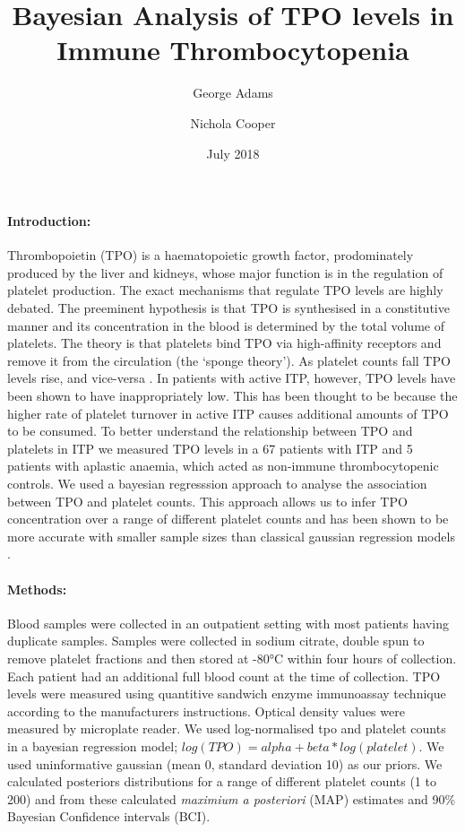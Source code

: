 \documentclass[11pt]{article}
\title{Bayesian Analysis of TPO levels in Immune Thrombocytopenia}
\author[1,2]{\small George Adams}
\author[1,2]{\small Nichola Cooper}
\affil[1]{\footnotesize Imperial College London, Kensington, London SW7 2AZ}
\affil[2]{\footnotesize Hammersmith Hospital, Imperial College NHS Trust, London W12 0HS}
\date{July 2018}
\begin{document}
\maketitle

\paragraph{Introduction:} Thrombopoietin (TPO) is a haematopoietic growth factor, prodominately produced by the liver and kidneys, whose major function is in the regulation of platelet production. The exact mechanisms that regulate TPO levels are highly debated. The preeminent hypothesis is that TPO is synthesised in a constitutive manner and its concentration in the blood is determined by the total volume of platelets. The theory is that platelets bind TPO via high-affinity receptors and remove it from the circulation (the `sponge theory'). As platelet counts fall TPO levels rise, and vice-versa \cite{EtoLinkagemechanismsthrombocytopenia2016}. %
In patients with active ITP, however, TPO levels have been shown to have inappropriately low. This has been thought to be because the higher rate of platelet turnover in active ITP causes additional amounts of TPO to be consumed. To better understand the relationship between TPO and platelets in ITP we measured TPO levels in a 67 patients with ITP and 5 patients with aplastic anaemia, which acted as non-immune thrombocytopenic controls. We used a bayesian regresssion approach to analyse the association between TPO and platelet counts. This approach allows us to infer TPO concentration over a range of different platelet counts and has been shown to be more accurate with smaller sample sizes than classical gaussian regression models \cite{GoldsteinBayesiananalysisregression1976}.


\paragraph{Methods:} Blood samples were collected in an outpatient setting with most patients having duplicate samples. Samples were collected in sodium citrate, double spun to remove platelet fractions and then stored at -80°C within four hours of collection. Each patient had an additional full blood count at the time of collection. TPO levels were measured using quantitive sandwich enzyme immunoassay technique according to the manufacturers instructions. Optical density values were measured by microplate reader. We used log-normalised tpo and platelet counts in a bayesian regression model; $log(TPO) = alpha + beta*log(platelet)$. We used uninformative gaussian (mean 0, standard deviation 10) as our priors. We calculated posteriors distributions for a range of different platelet counts (1 to 200) and from these calculated \textit{maximium a posteriori} (MAP) estimates and 90\% Bayesian Confidence intervals (BCI).
\end{document}
